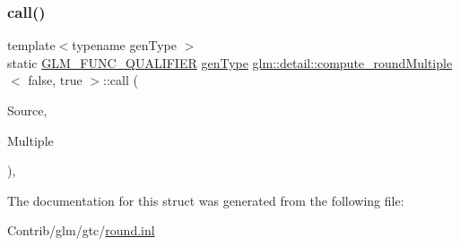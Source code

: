 \subsubsection{\texorpdfstring{call()}{call()}}
{\footnotesize\ttfamily template$<$typename gen\+Type $>$ \\
static \mbox{\hyperlink{setup_8hpp_a33fdea6f91c5f834105f7415e2a64407}{G\+L\+M\+\_\+\+F\+U\+N\+C\+\_\+\+Q\+U\+A\+L\+I\+F\+I\+ER}} \mbox{\hyperlink{structglm_1_1detail_1_1gen_type}{gen\+Type}} \mbox{\hyperlink{structglm_1_1detail_1_1compute__round_multiple}{glm\+::detail\+::compute\+\_\+round\+Multiple}}$<$ false, true $>$\+::call (\begin{DoxyParamCaption}\item[{\mbox{\hyperlink{structglm_1_1detail_1_1gen_type}{gen\+Type}}}]{Source,  }\item[{\mbox{\hyperlink{structglm_1_1detail_1_1gen_type}{gen\+Type}}}]{Multiple }\end{DoxyParamCaption})\hspace{0.3cm}{\ttfamily [inline]}, {\ttfamily [static]}}



The documentation for this struct was generated from the following file\+:\begin{DoxyCompactItemize}
\item 
Contrib/glm/gtc/\mbox{\hyperlink{round_8inl}{round.\+inl}}\end{DoxyCompactItemize}
